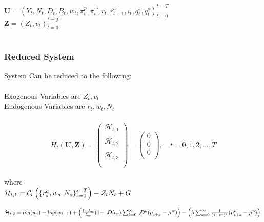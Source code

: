 \documentclass[titlepage]{\econtex}\providecommand{\texname}{BufferStockTheory}
\begin{document}
 
 
 $\mathbf{U} = \left(Y_{t} , N_{t} ,  D_{t
 }, B_{t}, w_{t} , \pi_{t}^{p} ,\pi_{t}^{w}, r_{t} , r_{t+1}^{a}, i_{t} , q_{t}^{s},  q_{t}^{s} \right)_{t=0}^{t=T}$ \\ 

 
 $\mathbf{Z} = \left(Z_{t} ,v_{t}\right)_{t=0}^{t=T}$ \\ \\
 
 
\hypertarget{Reduced System}{}
\subsubsection{Reduced System}
 
 System Can be reduced to the following: \\ \\
 
Exogenous Variables are $ Z_{t}, v_{t}$ \\ 

Endogenous Variables are $ r_{t} , w_{t} ,N_{t}$ \\ \\

\begin{eqnarray} 
H_{t}(\mathbf{U},\mathbf{Z})= \begin{pmatrix} 
\mathcal{H}_{t,1} \\ \\ 
\mathcal{H}_{t,2} \\ \\
\mathcal{H}_{t,3} \\ \\
 \end{pmatrix} = \begin{pmatrix} 0 \\ 0 \\ 0 \\ \end{pmatrix} , \quad  t = 0, 1, 2, ..., T 
 \end{eqnarray}
 
 where \\ 
 
 
 $\mathcal{H}_{t,1}  =\mathcal{C}_{t}\left( \left \{r^{a}_{s} , w_{s} , N_{s}  \right \}_{s=0}^{s=T} \right) - Z_{t} N_{t} + G\\ \\ $

$ \mathcal{H}_{t,2}  =log(w_{t}) - log(w_{t-1}) + \left( \frac{1 - \lambda_{w}}{\lambda_{w}}(1 - \not D \lambda_{w}) \sum_{k=0}^{\infty} \not D^{k} ( \mu_{t+k}^{w} - \mu^{w}) \right) - \left(  \lambda \sum_{k=0}^{\infty} \frac{1}{(1+r^{*})^{k}} ( \mu_{t+k}^{p} - \mu^{p})\right)\\ \\ $
\end{document}
